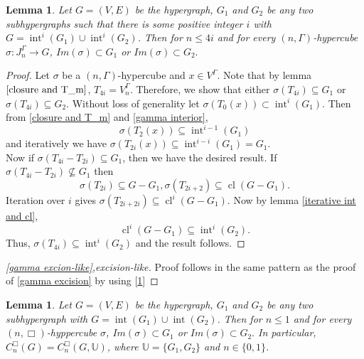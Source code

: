 \documentclass[10pt,a4paper]{amsart}
\newtheorem{lem}[subsection]{Lemma}
\newcommand{\cl}{\operatorname{cl}}
\renewcommand{\int}{\operatorname{int}}
\begin{document}
\begin{lem}\label{gamma excision-like proof}
	Let $G=(V, E)$ be the hypergraph, $G_1$ and $G_2$ be any two subhypergraphs such that there is some positive integer $i$ with $G=\int^i(G_1)\cup \int^i(G_2)$. Then for $n\leq 4i$ and for every $(n,\Gamma)$-hypercube $\sigma: J_n^\Gamma \rightarrow G$, $Im(\sigma)\subset G_1$ or $Im(\sigma) \subset G_2.$
\end{lem}
\begin{proof} Let $\sigma$ be a $(n,\Gamma)$-hypercube and $x\in V^\Gamma.$ Note that by lemma $\ref{closure and T_m}$, $T_{4i}=V_n^\Gamma$. Therefore, we show that either $\sigma(T_{4i})\subseteq G_1$ or $\sigma(T_{4i})\subseteq G_2$. Without loss of generality let  $\sigma(T_0(x))\subset \int^i(G_1)$. Then from \ref{closure and T_m} and \ref{gamma interior},  
\[\sigma(T_2(x))\subseteq \int^{i-1}(G_1)\] 
and iteratively we have $\sigma(T_{2i}(x))\subseteq \int^{i-i}(G_1)=G_1$.\\ 
Now if $\sigma(T_{4i}-T_{2i})\subseteq G_1$, then we have the desired result. If $\sigma(T_{4i}-T_{2i})\not\subseteq G_1$ then \[\sigma(T_{2i})\subseteq G-G_1, \sigma(T_{2i+2})\subseteq \cl(G-G_1).\] Iteration over $i$ gives $\sigma(T_{2i+2i})\subseteq \cl^i(G-G_1).$ Now by lemma \ref{iterative int and cl}, 
\[\cl^i(G-G_1)\subseteq\int^i(G_2).\] Thus, $\sigma(T_{4i})\subseteq \int^i(G_2)$ and the result follows.
\end{proof}



\begin{proof}[\ref{gamma excion-like},excision-like]

Proof follows in the same pattern as the proof of \ref{gamma excision} by using [\ref{gamma excision-like proof}]

\end{proof}


\begin{lem}\label{box excision lemma}
Let $G=(V,E)$ be the hypergraph, $G_1$ and $G_2$ be any two subhypergraph with  $G=\int(G_1)\cup \int(G_2)$. Then for $n\leq 1$ and for every $(n,\Box)$-hyppercube $\sigma$, $Im(\sigma)\subset G_1$ or $Im(\sigma) \subset G_2.$ In particular, $C_n^\Box(G)=C_n^\Box(G,\mathbb{U})$, where $\mathbb{U}=\{G_1,G_2\}$ and $n\in\{0,1\}$.
\end{lem}
\end{document}
